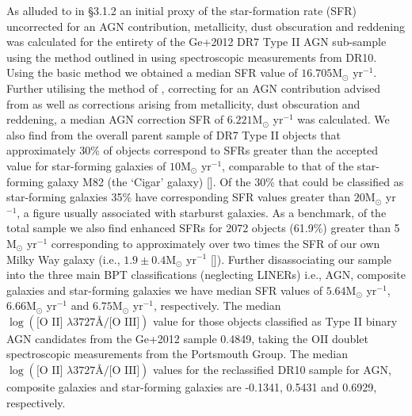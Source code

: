 As alluded to in §3.1.2 an initial proxy of the star-formation rate (SFR) uncorrected for an AGN contribution, metallicity, dust obscuration and reddening was calculated for the entirety of the Ge+2012 DR7 Type II AGN sub-sample using the method outlined in \cite{Kennicutt_1998} using spectroscopic measurements from DR10. Using the basic \cite{Kennicutt_1998} method we obtained a median SFR value of $16.705\text{M}_{\odot}$ yr$^{-1}$. Further utilising the method of \cite{Kewley_2004}, correcting for an AGN contribution advised from \cite{2006ApJ...642..702K} as well as corrections arising from metallicity, dust obscuration and reddening, a median AGN correction SFR of $6.221\text{M}_{\odot}$ yr$^{-1}$ was calculated. We also find from the overall parent sample of DR7 Type II objects that approximately 30\% of objects correspond to SFRs greater than the accepted value for star-forming galaxies of $10\text{M}_{\odot}$ yr$^{-1}$, comparable to that of the star-forming galaxy M82 (the ‘Cigar’ galaxy) [\cite{2009ApJ...706.1364F}]. Of the 30\% that could be classified as star-forming galaxies 35\% have corresponding SFR values greater than $20\text{M}_{\odot}$ yr$^{-1}$, a figure usually associated with starburst galaxies. As a benchmark, of the total sample we also find enhanced SFRs for 2072 objects (61.9\%) greater than 5 M$_{\odot}$ yr$^{-1}$ corresponding to approximately over two times the SFR of our own Milky Way galaxy (i.e., $1.9\pm{0.4}\text{M}_{\odot}$ yr$^{-1}$ [\cite{2011AJ....142..197C}]). Further disassociating our sample into the three main BPT classifications (neglecting LINERs) i.e., AGN, composite galaxies and star-forming galaxies we have median SFR values of $5.64\text{M}_{\odot}$ yr$^{-1}$, $6.66\text{M}_{\odot}$ yr$^{-1}$ and $6.75\text{M}_{\odot}$ yr$^{-1}$, respectively. The median $\log{(\text{[O II] }{\lambda}3727Å\text{/[O III]})}$ value for those objects classified as Type II binary AGN candidates from the Ge+2012 sample 0.4849, taking the OII doublet spectroscopic measurements from the Portsmouth Group. The median $\log{(\text{[O II] }{\lambda}3727Å\text{/[O III]})}$ values for the reclassified DR10 sample for AGN, composite galaxies and star-forming galaxies are -0.1341, 0.5431 and 0.6929, respectively.       